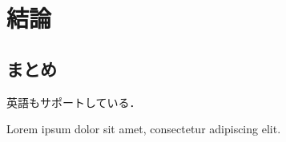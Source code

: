 \chapter{結論}

\section{まとめ}

英語もサポートしている．

Lorem ipsum dolor sit amet, consectetur adipiscing elit.
